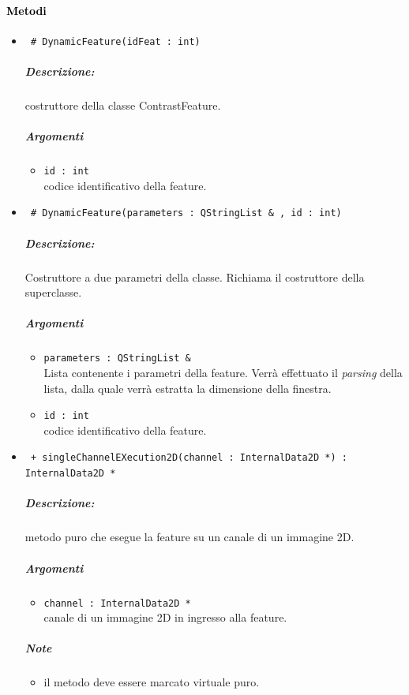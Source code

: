 \paragraph{\textcolor{black}{Metodi\\}}
	\begin{itemize}
	\item \color{blue}\verb! # DynamicFeature(idFeat : int)!
		\color{black}
		\subparagraph{Descrizione:} costruttore della classe ContrastFeature.
		\subparagraph{Argomenti}
			\begin{itemize}
				\item \color{RoyalPurple} \verb!id : int! \\ 
				\color{black} codice identificativo della feature\g{}.	
			\end{itemize}
			
	\item \color{blue}\verb! # DynamicFeature(parameters : QStringList & , id : int)!
		\color{black}
		\subparagraph{Descrizione:} Costruttore a due parametri della classe. Richiama il costruttore della 						superclasse.
		\subparagraph{Argomenti}
			\begin{itemize}	
				\item \color{RoyalPurple} \verb!parameters : QStringList &! \\ 
				\color{black} Lista contenente i parametri della feature\g{}. Verrà effettuato il \textit{parsing} 						della lista, dalla quale verrà estratta la dimensione della finestra.
				\item \color{RoyalPurple} \verb!id : int! \\ 
				\color{black} codice identificativo della feature\g{}.	
			\end{itemize}

	\item \color{blue}\verb! + singleChannelEXecution2D(channel : InternalData2D *) : InternalData2D *!
		\color{black}
		\subparagraph{Descrizione:} metodo puro che esegue la feature su un canale di un immagine 2D.
		\subparagraph{Argomenti}
			\begin{itemize}
				\item \color{RoyalPurple} \verb!channel : InternalData2D * ! \\ 
				\color{black} canale di un immagine 2D in ingresso alla feature.		
			\end{itemize}
		\subparagraph{Note}
			\begin{itemize}
				\item il metodo deve essere marcato virtuale puro.
			\end{itemize}
			

\end{itemize}
